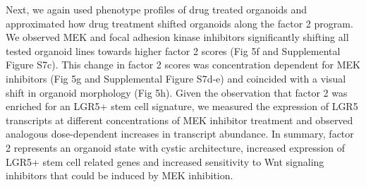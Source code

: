 \begin{flushleft}
Next, we again used phenotype profiles of drug treated organoids and approximated how drug treatment shifted organoids along the factor 2 program. We observed MEK and focal adhesion kinase inhibitors significantly shifting all tested organoid lines towards higher factor 2 scores (Fig 5f and Supplemental Figure S7c). This change in factor 2 scores was concentration dependent for MEK inhibitors (Fig 5g and Supplemental Figure S7d-e) and coincided with a visual shift in organoid morphology (Fig 5h). Given the observation that factor 2 was enriched for an LGR5+ stem cell signature, we measured the expression of LGR5 transcripts at different concentrations of MEK inhibitor treatment and observed analogous dose-dependent increases in transcript abundance. In summary, factor 2 represents an organoid state with cystic architecture, increased expression of LGR5+ stem cell related genes and increased sensitivity to Wnt signaling inhibitors that could be induced by MEK inhibition.

\end{flushleft}